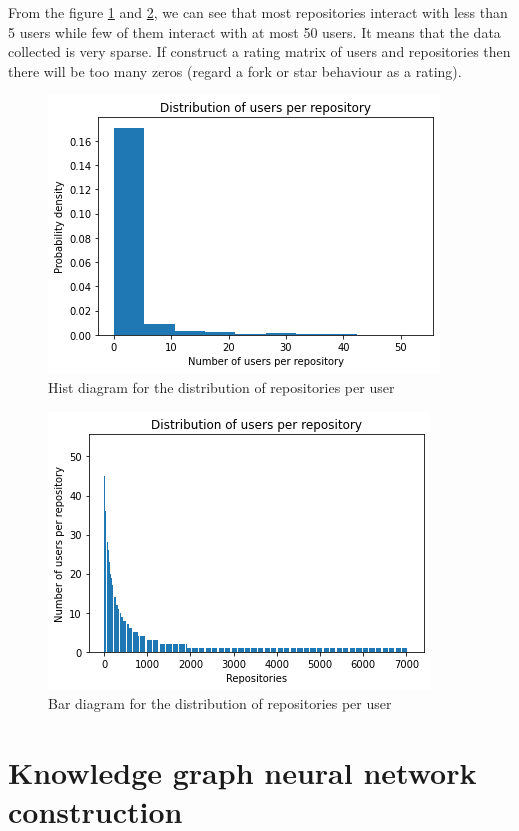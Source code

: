\documentclass[11pt,twoside]{report}
\begin{document}
From the figure \ref{fig:user_repo_dist_hist} and \ref{fig:user_repo_dist_bar}, we can see that most repositories interact with less than 5 users while few of them interact with at most 50 users. It means that the data collected is very sparse. If construct a rating matrix of users and repositories then there will be too many zeros (regard a fork or star behaviour as a rating).

\begin{figure}[H]
    \centering
    \includegraphics[scale=0.9]{user_repo_dist_hist.png}
    \caption{Hist diagram for the distribution of repositories per user}
    \label{fig:user_repo_dist_hist}
\end{figure}

\begin{figure}[H]
    \centering
    \includegraphics[scale=0.9]{user_repo_dist_bar.png}
    \caption{Bar diagram for the distribution of repositories per user}
    \label{fig:user_repo_dist_bar}
\end{figure}

\section{Knowledge graph neural network construction}
\end{document}
